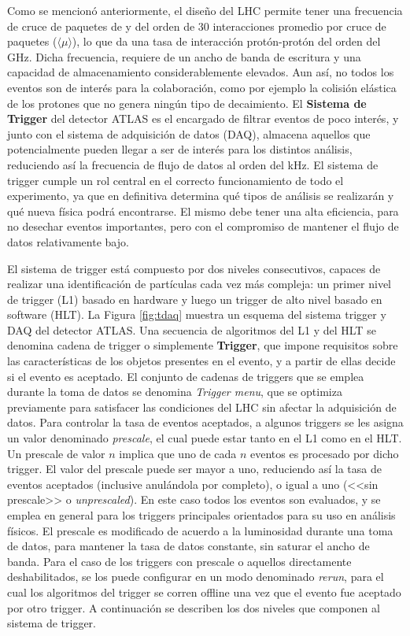 Como se mencionó anteriormente, el diseño del LHC permite tener una frecuencia de cruce de paquetes de  y del orden de 30 interacciones promedio por cruce de paquetes ($\langle \mu \rangle$), lo que da una tasa de interacción protón-protón del orden del GHz. Dicha frecuencia, requiere de un ancho de banda de escritura y una capacidad de almacenamiento considerablemente elevados. Aun así, no todos los eventos son de interés para la colaboración, como por ejemplo la colisión elástica de los protones que no genera ningún tipo de decaimiento. El \textbf{Sistema de Trigger} del detector ATLAS \cite{TRIG-2016-01} es el encargado de filtrar eventos de poco interés, y junto con el sistema de adquisición de datos (DAQ), almacena aquellos que potencialmente pueden llegar a ser de interés para los distintos análisis, reduciendo así la frecuencia de flujo de datos al orden del kHz. El sistema de trigger cumple un rol central en el correcto funcionamiento de todo el experimento, ya que en definitiva determina qué tipos de análisis se realizarán y qué nueva física podrá encontrarse. El mismo debe tener una alta eficiencia, para no desechar eventos importantes, pero con el compromiso de mantener el flujo de datos relativamente bajo. 

El sistema de trigger está compuesto por dos niveles consecutivos, capaces de realizar una identificación de partículas cada vez más compleja: un primer nivel de trigger (L1) basado en hardware y luego un trigger de alto nivel basado en software (HLT). La Figura \ref{fig:tdaq} muestra un esquema del sistema trigger y DAQ del detector ATLAS. Una secuencia de algoritmos del L1 y del HLT se denomina cadena de trigger o simplemente \textbf{Trigger}, que impone requisitos sobre las características de los objetos presentes en el evento, y a partir de ellas decide si el evento es aceptado. El conjunto de cadenas de triggers que se emplea durante la toma de datos se denomina \textit{Trigger menu}, que se optimiza previamente para satisfacer las condiciones del LHC sin afectar la adquisición de datos. Para controlar la tasa de eventos aceptados, a algunos triggers se les asigna un valor denominado \textit{prescale}, el cual puede estar tanto en el L1 como en el HLT. Un prescale de valor $n$ implica que uno de cada $n$ eventos es procesado por dicho trigger. El valor del prescale puede ser mayor a uno, reduciendo así la tasa de eventos aceptados (inclusive anulándola por completo), o igual a uno (<<sin prescale>> o \textit{unprescaled}). En este caso todos los eventos son evaluados, y se emplea en general para los triggers principales orientados para su uso en análisis físicos. El prescale es modificado de acuerdo a la luminosidad durante una toma de datos, para mantener la tasa de datos constante, sin saturar el ancho de banda. Para el caso de los triggers con prescale o aquellos directamente deshabilitados, se los puede configurar en un modo denominado \textit{rerun}, para el cual los algoritmos del trigger se corren offline una vez que el evento fue aceptado por otro trigger. A continuación se describen los dos niveles que componen al sistema de trigger.


